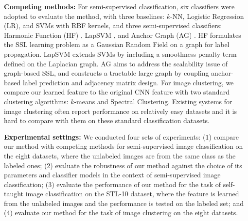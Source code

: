 \documentclass[preprint,12pt,3p]{elsarticle}
\begin{document}


\textbf{Competing methods:} For semi-supervised classification, six
classifiers were adopted to evaluate the method, with three baselines:
$k$-NN, Logistic Regression (LR), and SVMs with RBF kernels, and three
semi-supervised classifiers: Harmonic Function (HF)
\citep{Zhu:Harmonic:03}, LapSVM \citep{Belkin:semiframe:2006}, and
Anchor Graph (AG) \citep{icml10:large:graph:ssl}. HF formulates the SSL
learning problem as a Gaussian Random Field on a graph for label
propagation. LapSVM extends SVMs by including a smoothness penalty
term defined on the Laplacian graph. AG aims to address the
scalability issue of graph-based SSL, and constructs a tractable large
graph by coupling anchor-based label prediction and adjacency matrix
design.  For image clustering, we compare our learned feature to the
original CNN feature with two standard clustering algorithms: $k$-means
and Spectral Clustering. Existing systems for image clustering often
report performance on relatively easy datasets and it is hard to compare
with them on these standard classification datasets.


\textbf{Experimental settings:} We conducted four sets of experiments:
(1) compare our method with competing methods for semi-supervised
image classification on the eight datasets, where the unlabeled images
are from the same class as the labeled ones; (2) evaluate the
robustness of our method against the choice of its parameters and classifier models
in the context of semi-supervised image classification; (3) evaluate
the performance of our method for the task of self-taught image
classification on the STL-10 dataset, where the feature is learned from
the unlabeled images and the performance is tested on the labeled set;
and (4) evaluate our method for the task of image clustering on the
eight datasets.
\end{document}
